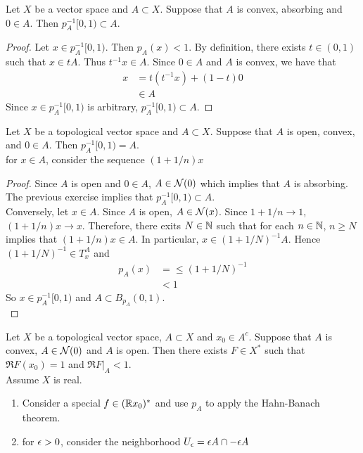 \documentclass{book}
\begin{document}
	\begin{ex}
		Let $X$ be a vector space and $A \subset X$. Suppose that $A$ is convex, absorbing and $0 \in A$. Then $p_A^{-1}[0, 1) \subset A$. 
	\end{ex}

	\begin{proof}
		Let $x \in p_A^{-1}[0, 1)$. Then $p_A(x) < 1$. By definition, there exists $t \in (0,1)$ such that $x \in tA$. Thus $t^{-1}x \in A$. Since $0 \in A$ and $A$ is convex, we have that 
		\begin{align*}
			x
			&= t (t^{-1}x) + (1-t)0 \\
			& \in A
		\end{align*}
	 	Since $x \in p_A^{-1}[0, 1)$ is arbitrary, $p_A^{-1}[0, 1) \subset A$.
	\end{proof}

		\begin{ex}
		Let $X$ be a topological vector space and $A \subset X$. Suppose that $A$ is open, convex, and $0 \in A$. Then $p_A^{-1}[0, 1) = A$.\\
		 for $x \in A$, consider the sequence $(1 + 1/n)x$
	\end{ex}
	
	\begin{proof}
		Since $A$ is open and $0 \in A$, $A \in \mathcal{N}(0)$ which implies that $A$ is absorbing. The previous exercise implies that $p_A^{-1}[0, 1) \subset A$. \\
		Conversely, let $x \in A$. Since $A$ is open, $A \in \mathcal{N}(x)$. Since $1 + 1/n \rightarrow 1$, $(1 + 1/n)x \rightarrow x$. Therefore, there exits $N \in \mathbb{N}$ such that for each $n \in \mathbb{N}$, $n \geq N$ implies that $(1 + 1/n)x \in A$. In particular, $x \in (1 + 1/N)^{-1}A$. Hence $(1 + 1/N)^{-1} \in T_x^A$ and
		\begin{align*}
			p_A(x)
			&= \leq (1 + 1/N)^{-1} \\
			& < 1
		\end{align*}
		So $x \in p_A^{-1}[0, 1)$ and $A \subset B_{p_A}(0,1)$. \\
	\end{proof}

	\begin{ex}
		Let $X$ be a topological vector space, $A \subset X$ and $x_0 \in A^c$. Suppose that $A$ is convex, $A \in \mathcal{N}(0)$ and $A$ is open. Then there exists $F \in X^*$ such that $\Re F(x_0) =1$ and $\Re F|_A < 1$. \\
		 Assume $X$ is real.
		\begin{enumerate}
			\item {} Consider a special $f \in (\mathbb{R} x_0)^*$ and use $p_A$ to apply the Hahn-Banach theorem.
			\item {} for $\epsilon > 0$, consider the neighborhood $U_{\epsilon} = \epsilon A \cap - \epsilon A$
		\end{enumerate} 
	\end{ex}
\end{document}
